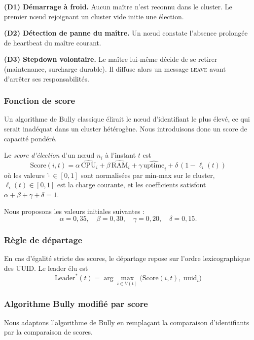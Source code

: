 \textbf{(D1) Démarrage à froid.} Aucun maître n'est reconnu dans le cluster. Le premier nœud rejoignant un cluster vide initie une élection.

\textbf{(D2) Détection de panne du maître.} Un nœud constate l'absence prolongée de heartbeat du maître courant.

\textbf{(D3) Stepdown volontaire.} Le maître lui-même décide de se retirer (maintenance, surcharge durable). Il diffuse alors un message \textsc{leave} avant d'arrêter ses responsabilités.

\subsubsection{Fonction de score}

Un algorithme de Bully classique élirait le nœud d'identifiant le plus élevé, ce qui serait inadéquat dans un cluster hétérogène. Nous introduisons donc un score de capacité pondéré.

\begin{definition}
Le \emph{score d'élection} d'un nœud $n_i$ à l'instant $t$ est
\[
\mathrm{Score}(i, t) = \alpha \, \widehat{\mathrm{CPU}}_i + \beta \, \widehat{\mathrm{RAM}}_i + \gamma \, \widehat{\mathrm{uptime}}_i + \delta \, (1 - \ell_i(t))
\]
où les valeurs $\widehat{\cdot} \in [0,1]$ sont normalisées par min-max sur le cluster, $\ell_i(t) \in [0,1]$ est la charge courante, et les coefficients satisfont $\alpha + \beta + \gamma + \delta = 1$.
\end{definition}

Nous proposons les valeurs initiales suivantes :
\[
\alpha = 0{,}35, \quad \beta = 0{,}30, \quad \gamma = 0{,}20, \quad \delta = 0{,}15.
\]

\subsubsection{Règle de départage}

En cas d'égalité stricte des scores, le départage repose sur l'ordre lexicographique des UUID. Le leader élu est
\[
\mathrm{Leader}^*(t) = \arg\max_{i \in V(t)} \big( \mathrm{Score}(i,t), \; \mathrm{uuid}_i \big)
\]

\subsubsection{Algorithme Bully modifié par score}

Nous adaptons l'algorithme de Bully en remplaçant la comparaison d'identifiants par la comparaison de scores.

